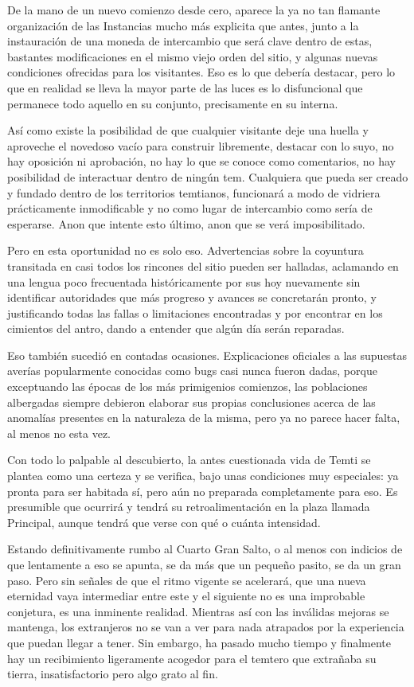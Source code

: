\documentclass[
  spanish,
]{book}
\begin{document}
De la mano de un nuevo comienzo desde cero, aparece la ya no tan flamante organización de las Instancias mucho más explicita que antes, junto a la instauración de una moneda de intercambio que será clave dentro de estas, bastantes modificaciones en el mismo viejo orden del sitio, y algunas nuevas condiciones ofrecidas para los visitantes. Eso es lo que debería destacar, pero lo que en realidad se lleva la mayor parte de las luces es lo disfuncional que permanece todo aquello en su conjunto, precisamente en su interna.

Así como existe la posibilidad de que cualquier visitante deje una huella y aproveche el novedoso vacío para construir libremente, destacar con lo suyo, no hay oposición ni aprobación, no hay lo que se conoce como comentarios, no hay posibilidad de interactuar dentro de ningún tem. Cualquiera que pueda ser creado y fundado dentro de los territorios temtianos, funcionará a modo de vidriera prácticamente inmodificable y no como lugar de intercambio como sería de esperarse. Anon que intente esto último, anon que se verá imposibilitado.

Pero en esta oportunidad no es solo eso. Advertencias sobre la coyuntura transitada en casi todos los rincones del sitio pueden ser halladas, aclamando en una lengua poco frecuentada históricamente por sus hoy nuevamente sin identificar autoridades que más progreso y avances se concretarán pronto, y justificando todas las fallas o limitaciones encontradas y por encontrar en los cimientos del antro, dando a entender que algún día serán reparadas.

Eso también sucedió en contadas ocasiones. Explicaciones oficiales a las supuestas averías popularmente conocidas como bugs casi nunca fueron dadas, porque exceptuando las épocas de los más primigenios comienzos, las poblaciones albergadas siempre debieron elaborar sus propias conclusiones acerca de las anomalías presentes en la naturaleza de la misma, pero ya no parece hacer falta, al menos no esta vez.

Con todo lo palpable al descubierto, la antes cuestionada vida de Temti se plantea como una certeza y se verifica, bajo unas condiciones muy especiales: ya pronta para ser habitada sí, pero aún no preparada completamente para eso. Es presumible que ocurrirá y tendrá su retroalimentación en la plaza llamada Principal, aunque tendrá que verse con qué o cuánta intensidad.

Estando definitivamente rumbo al Cuarto Gran Salto, o al menos con indicios de que lentamente a eso se apunta, se da más que un pequeño pasito, se da un gran paso. Pero sin señales de que el ritmo vigente se acelerará, que una nueva eternidad vaya intermediar entre este y el siguiente no es una improbable conjetura, es una inminente realidad. Mientras así con las inválidas mejoras se mantenga, los extranjeros no se van a ver para nada atrapados por la experiencia que puedan llegar a tener. Sin embargo, ha pasado mucho tiempo y finalmente hay un recibimiento ligeramente acogedor para el temtero que extrañaba su tierra, insatisfactorio pero algo grato al fin.
\end{document}
